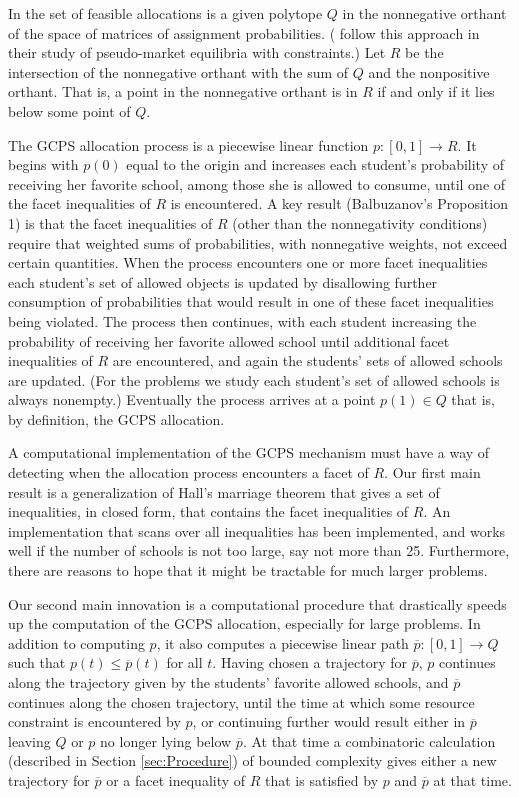 \documentclass[12pt, A4paper]{article}
\theoremstyle{definition}
\newcommand{\barp}{\overline{p}}
\begin{document}
In \cite{balbuzanov22jet} the set of feasible allocations is a given polytope $Q$ in the nonnegative orthant of the space of matrices of assignment probabilities. (\cite{EcMiZh21} follow this approach in their study of pseudo-market equilibria with constraints.) Let $R$ be the intersection of the nonnegative orthant with the sum of $Q$ and the nonpositive orthant.  That is, a point in the nonnegative orthant is in  $R$ if and only if it lies below some point of $Q$.  

The GCPS allocation process is a piecewise linear function $p \colon [0,1] \to R$.  It begins with $p(0)$ equal to the origin and increases each student's probability of receiving her favorite school, among those she is allowed to consume, until one of the facet inequalities of $R$ is encountered.  
A key result (Balbuzanov's Proposition 1) is that the facet inequalities of $R$ (other than the nonnegativity conditions) require that weighted sums of probabilities, with nonnegative weights, not exceed certain quantities.  When the process encounters one or more facet inequalities  each student's set of allowed objects is updated by disallowing further consumption of probabilities that would result in one of these facet inequalities being violated.   The process then continues, with each student increasing the probability of receiving her favorite allowed school until additional facet inequalities of $R$ are encountered, and again the students' sets of allowed schools are updated. (For the problems we study each student's set of allowed schools is always nonempty.) Eventually the process arrives at a point  $p(1) \in Q$ that is, by definition, the GCPS allocation.

A computational implementation of the GCPS mechanism must have a way of detecting when the allocation process encounters a facet of $R$.  Our first main result is a generalization of Hall's marriage theorem that gives a set of inequalities, in closed form, that contains the facet inequalities of $R$.   An implementation that scans over all inequalities has been implemented, and works well if the number of schools is not too large, say not more than 25.  Furthermore, there are reasons to hope that it might be tractable for much larger problems.

Our second main innovation is a computational procedure that drastically speeds up the computation of the GCPS allocation, especially for large problems. In addition to computing $p$, it also computes a piecewise linear path $\barp \colon [0,1] \to Q$ such that $p(t) \le \barp(t)$ for all $t$.  Having chosen a trajectory for $\barp$, $p$ continues along the trajectory given by the students' favorite allowed schools, and $\barp$ continues along the chosen trajectory, until the time at which some resource constraint is encountered by $p$, or continuing further would result either in $\barp$ leaving $Q$ or $p$ no longer lying below $\barp$.  At that time a combinatoric calculation (described in Section \ref{sec:Procedure}) of bounded complexity gives either a new trajectory for $\barp$ or a facet inequality of $R$ that is satisfied by $p$ and $\barp$ at that time.
\end{document}
